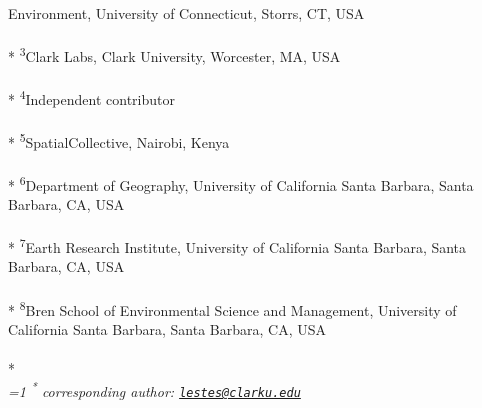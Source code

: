 \documentclass[11pt,a4paper]{article}
\begin{document}
\begin{singlespace}
\begin{justify}
Environment, University of Connecticut, Storrs, CT, USA\\\\*
\footnotesize\textsuperscript{3}Clark Labs, Clark University, Worcester,
MA, USA\\\\*
\footnotesize\textsuperscript{4}Independent contributor\\\\*
\footnotesize\textsuperscript{5}SpatialCollective, Nairobi, Kenya\\\\*
\footnotesize\textsuperscript{6}Department of Geography, University of
California Santa Barbara, Santa Barbara, CA, USA\\\\*
\footnotesize\textsuperscript{7}Earth Research Institute, University of
California Santa Barbara, Santa Barbara, CA, USA\\\\*
\footnotesize\textsuperscript{8}Bren School of Environmental Science and
Management, University of California Santa Barbara, Santa Barbara, CA,
USA\\\\*
\setcounter{num}{1}
\\[0.1cm]
\footnotesize \emph{
\ifnum\value{num}=1%
\textsuperscript{*} corresponding author:
\fi
\href{mailto:lestes@clarku.edu}{\nolinkurl{lestes@clarku.edu}}
}
\end{justify}
\normalsize


\end{singlespace}
\end{document}
